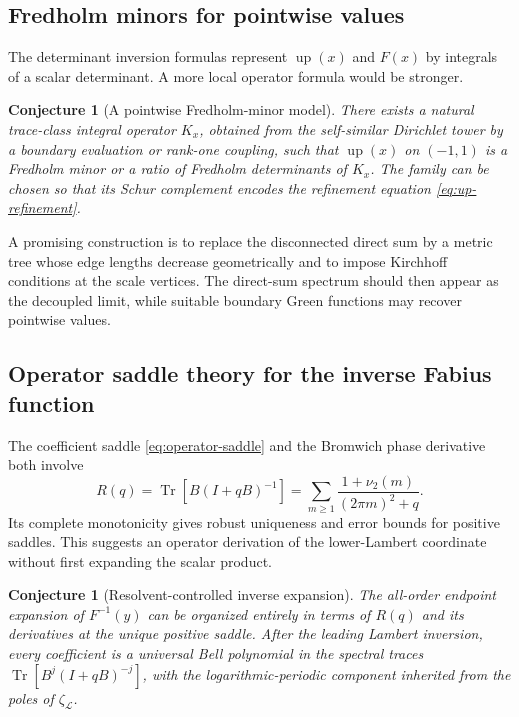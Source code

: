 \documentclass[11pt,oneside]{article}
\newtheorem{conjecture}[theorem]{Conjecture}
\theoremstyle{definition}
\newcommand{\Up}{\operatorname{up}}
\newcommand{\Tr}{\operatorname{Tr}}
\newcommand{\vtwo}{\nu_2}
\begin{document}
\subsection{Fredholm minors for pointwise values}

The determinant inversion formulas represent \(\Up(x)\) and \(F(x)\) by integrals of
a scalar determinant.  A more local operator formula would be stronger.

\begin{conjecture}[A pointwise Fredholm-minor model]
\label{conj:minor}
There exists a natural trace-class integral operator \(K_x\), obtained from the
self-similar Dirichlet tower by a boundary evaluation or rank-one coupling, such that
\(\Up(x)\) on \((-1,1)\) is a Fredholm minor or a ratio of Fredholm determinants of
\(K_x\).  The family can be chosen so that its Schur complement encodes the refinement
equation \eqref{eq:up-refinement}.
\end{conjecture}

A promising construction is to replace the disconnected direct sum by a metric tree
whose edge lengths decrease geometrically and to impose Kirchhoff conditions at the
scale vertices.  The direct-sum spectrum should then appear as the decoupled limit,
while suitable boundary Green functions may recover pointwise values.

\subsection{Operator saddle theory for the inverse Fabius function}

The coefficient saddle \eqref{eq:operator-saddle} and the Bromwich phase derivative
both involve
\begin{equation}
 R(q)=\Tr[B(I+qB)^{-1}]
 =\sum_{m\ge1}\frac{1+\vtwo(m)}{(2\pi m)^2+q}.
 \label{eq:Rq}
\end{equation}
Its complete monotonicity gives robust uniqueness and error bounds for positive
saddles.  This suggests an operator derivation of the lower-Lambert coordinate without
first expanding the scalar product.

\begin{conjecture}[Resolvent-controlled inverse expansion]
\label{conj:inverse-resolvent}
The all-order endpoint expansion of \(F^{-1}(y)\) can be organized entirely in terms
of \(R(q)\) and its derivatives at the unique positive saddle.  After the leading
Lambert inversion, every coefficient is a universal Bell polynomial in the spectral
traces \(\Tr[B^j(I+qB)^{-j}]\), with the logarithmic-periodic component inherited from
the poles of \(\zeta_{\mathscr L}\).
\end{conjecture}
\end{document}
